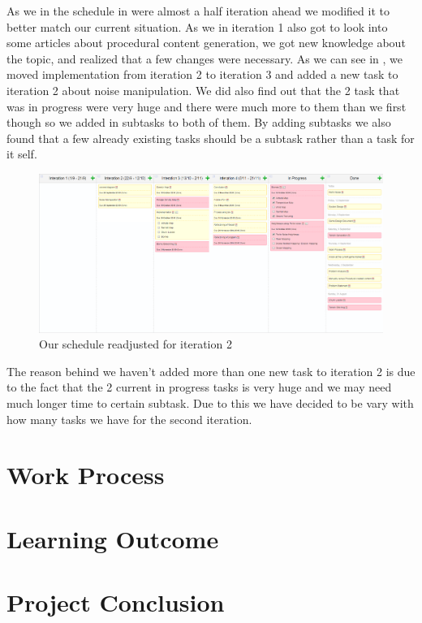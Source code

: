 As we in the schedule in  were almost a half iteration ahead we modified it to better match our current situation. As we in iteration 1 also got to look into some articles about procedural content generation, we got new knowledge about the topic, and realized that a few changes were necessary. As we can see in , we moved implementation from iteration 2 to iteration 3 and added a new task to iteration 2 about noise manipulation. We did also find out that the 2 task that was in progress were very huge and there were much more to them than we first though so we added in subtasks to both of them. By adding subtasks we also found that a few already existing tasks should be a subtask rather than a task for it self.

\begin{figure}[H]
	\includegraphics[width=1.0\linewidth]{img/BeforeIteration2}
	\centering
	\caption{Our schedule readjusted for iteration 2}
	\label{fig:BeforeIteration2}
\end{figure}

The reason behind we haven't added more than one new task to iteration 2 is due to the fact that the 2 current in progress tasks is very huge and we may need much longer time to certain subtask. Due to this we have decided to be vary with how many tasks we have for the second iteration.

\section{Work Process}



\section{Learning Outcome}



\section{Project Conclusion}

